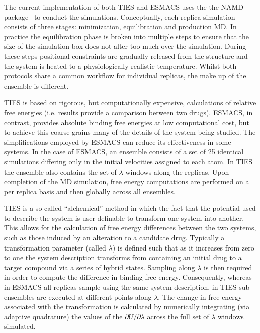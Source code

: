 
The current implementation of both TIES and ESMACS uses the the NAMD 
package~\cite{Phillips2005} to conduct the simulations. Conceptually, each 
replica simulation consists of three stages: minimization, equilibration and 
production MD. In practice the equilibration phase is broken into multiple 
steps to ensure that the size of the simulation box does not alter too much 
over the simulation. During these steps positional constraints are gradually 
released from the structure and the system is heated to a physiologically 
realistic temperature. Whilst both protocols share a common workflow for 
individual replicas, the make up of the ensemble is different.


TIES is based on rigorous, but computationally expensive, calculations of 
relative free energies (i.e. results provide a comparison between two drugs). 
ESMACS, in contrast, provides absolute binding free energies at low 
computational cost, but to achieve this coarse grains many of the details of 
the system being studied. The simplifications employed by ESMACS can reduce its 
effectiveness in some systems. In the case of ESMACS, an ensemble consists of a 
set of 25 identical simulations differing only in the initial velocities 
assigned to each atom. In TIES the ensemble also contains the set of $\lambda$ 
windows along the replicas. Upon completion of the MD simulation, free energy 
computations are performed on a per replica basis and then globally across all 
ensembles. 





TIES is a so called ``alchemical'' method in which the fact that the potential 
used to describe the system is user definable to transform one system into 
another. This allows for the calculation of free energy differences between 
the two systems, such as those induced by an alteration to a candidate drug.
Typically a transformation parameter (called $\lambda$) is defined such 
that as it increases from zero to one the system description transforms from 
containing an initial drug to a target compound via a series of hybrid states.
Sampling along $\lambda$ is then required in order to compute the difference 
in binding free energy. Consequently, whereas in ESMACS all replicas sample 
using the same system description, in TIES sub-ensembles are executed at 
different points along $\lambda$. The change in free energy associated 
with the transformation is calculated by numerically integrating 
(via adaptive quadrature) the values of the $\partial U/\partial\lambda$ 
across the full set of $\lambda$ windows simulated. 

